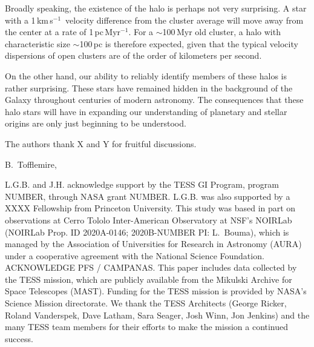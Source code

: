 \documentclass[12pt,twocolumn,tighten]{aastex63}
\newcommand{\kms}{\,km\,s$^{-1}$}
\begin{document}

Broadly speaking, the existence of the halo is perhaps not very
surprising.  A star with a 1\kms\ velocity difference from the cluster
average will move away from the center at a rate of 1\,pc\,Myr$^{-1}$.
For a $\sim$100\,Myr old cluster, a halo with characteristic size
$\sim$100\,pc is therefore expected, given that the typical velocity
dispersions of open clusters are of the order of kilometers per
second.

On the other hand, our ability to reliably identify members of these
halos is rather surprising.  These stars have
remained hidden in the background of the Galaxy throughout centuries
of modern astronomy.  The consequences that these halo stars will have
in expanding our understanding of planetary and stellar origins are
only just beginning to be understood.




\acknowledgements
\raggedbottom

The authors thank X and Y for fruitful discussions.

B.~Tofflemire, %


%
L.G.B. and J.H. acknowledge support by the TESS GI Program, program
NUMBER, through NASA grant NUMBER.
L.G.B. was also supported by a XXXX Fellowship from Princeton
University.
%
This study was based in part on observations at Cerro Tololo
Inter-American Observatory at NSF's NOIRLab (NOIRLab Prop. ID
2020A-0146; 2020B-NUMBER PI: L{.}~Bouma), which is managed by the
Association of Universities for Research in Astronomy (AURA) under a
cooperative agreement with the National Science Foundation.
%
ACKNOWLEDGE PFS / CAMPANAS.
%
This paper includes data collected by the TESS mission, which are
publicly available from the Mikulski Archive for Space Telescopes
(MAST).
%
Funding for the TESS mission is provided by NASA's Science Mission
directorate.
%
We thank the TESS Architects (George Ricker, Roland Vanderspek, Dave
Latham, Sara Seager, Josh Winn, Jon Jenkins) and the many TESS team
members for their efforts to make the mission a continued success.
%
\end{document}
